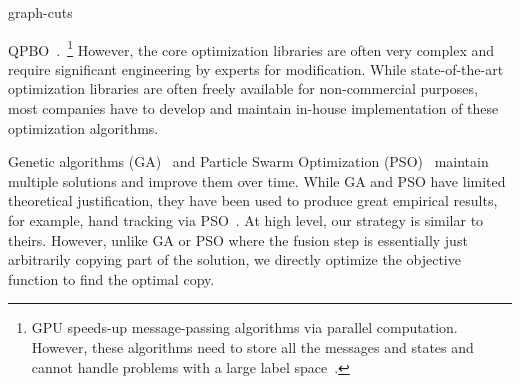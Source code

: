 graph-cuts
\cite{strandmark2010parallel}


QPBO~\cite{}.~\footnote{GPU speeds-up message-passing algorithms via
parallel computation. However, these algorithms need to store all the
messages and states and cannot handle problems with a large label space~\cite{layered_depthmap}.} However, the core optimization libraries are often
very complex and require significant engineering by experts for
modification.
%
While state-of-the-art optimization libraries are often freely available for
non-commercial purposes, most companies have to develop and maintain
in-house implementation of these optimization algorithms.




\noindent
Genetic algorithms (GA)~\cite{ga} and Particle Swarm
Optimization (PSO)~\cite{pso} maintain multiple solutions and improve
them over time.
%
While GA and PSO have limited theoretical justification, they have been
used to produce great empirical results, for example, hand tracking via
PSO~\cite{pushmeet_hand_tracking}.  At high level, our strategy is
similar to theirs. However, unlike GA or PSO where the fusion step is
essentially just arbitrarily copying part of the solution, we 
directly optimize the objective function to find the optimal copy.


